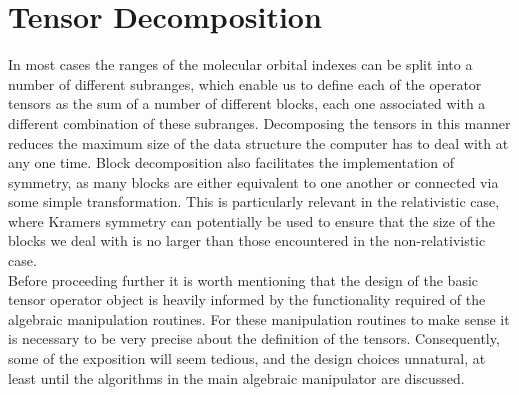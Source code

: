 \section{Tensor Decomposition}
\noindent In most cases the ranges of the molecular orbital indexes can be split into a
number of different subranges, which enable us to define each of the operator
tensors as the sum of a number of different blocks, each one associated with a
different combination of these subranges. Decomposing the tensors in this
manner reduces the maximum size of the data structure the computer has to deal
with at any one time. Block decomposition also facilitates the implementation
of symmetry, as many blocks are either equivalent to one another or connected
via some simple transformation. This is particularly relevant in the
relativistic case, where Kramers symmetry can potentially be used to ensure
that the size of the blocks we deal with is no larger than those encountered in
the non-relativistic case.\\

\noindent Before proceeding further it is worth mentioning that the design of
the basic tensor operator object is heavily informed by the functionality
required of the algebraic manipulation routines. For these manipulation 
routines to make sense it is necessary to be very precise about the 
definition of the tensors. Consequently, some of the exposition will 
seem tedious, and the design choices unnatural, at least until the algorithms in the main algebraic
manipulator are discussed.\\ 

